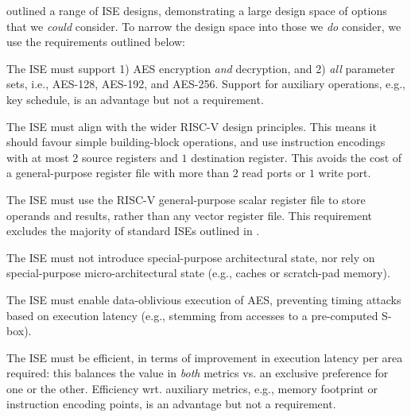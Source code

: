 
outlined a range of ISE designs, demonstrating a large design space of
options that we {\em could} consider.  To narrow the design space into
those we {\em do} consider, we use the requirements outlined below:

\begin{requirement}\label{req:1}
The ISE must support
1) AES encryption {\em and} decryption,
   and
2) {\em all} parameter sets, i.e., AES-128, AES-192, and AES-256.
Support for 
auxiliary operations, e.g., key schedule, 
is an advantage but not a requirement.
\end{requirement}

\begin{requirement}\label{req:2}
The ISE must align with the wider RISC-V design principles.
This means it should 
favour simple building-block operations,
and
use instruction encodings with at most
$2$ source registers and
$1$ destination register.
This avoids the cost of a general-purpose register file with more than $2$
read ports or $1$ write port.
\end{requirement}

\begin{requirement}\label{req:3}
The ISE must use
the RISC-V general-purpose scalar register file 
to store operands and results, rather than
any vector register file.
This requirement excludes the majority of standard ISEs outlined in 
.
\end{requirement}

\begin{requirement}\label{req:4}
The ISE must not introduce
special-purpose       architectural state, 
nor rely on
special-purpose micro-architectural state
(e.g., caches or scratch-pad memory).
\end{requirement}

\begin{requirement}\label{req:5}
The ISE must enable data-oblivious execution of AES, preventing
timing attacks based on execution latency
(e.g., stemming from accesses to a pre-computed S-box).
\end{requirement}

\begin{requirement}
The ISE must be efficient, in terms of improvement in execution latency 
per area required: this balances the value in {\em both} metrics vs. an 
exclusive preference for one or the other.
Efficiency wrt. 
auxiliary metrics, e.g., memory footprint or instruction encoding points,
is an advantage but not a requirement.
\end{requirement}

